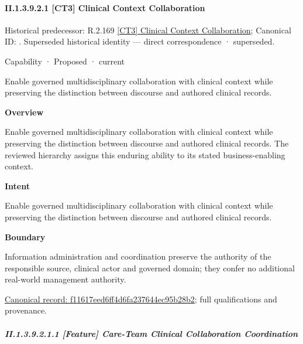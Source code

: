 \paragraph*{II.1.3.9.2.1 [CT3] Clinical Context Collaboration}
\label{navigation:II.1.3.9.2.1}

{\small Historical predecessor: R.2.169 \hyperref[element:750ef0d8e1504a8e9a1fde9bf13a6d0c]{[CT3] Clinical Context Collaboration}; Canonical ID: \texttt{}. Superseded historical identity — direct correspondence · superseded.}\par
\label{element:f11617eed6ff4d6fa237644ec95b28b2}
{\small Capability · Proposed · current}\par

Enable governed multidisciplinary collaboration with clinical context while preserving the distinction between discourse and authored clinical records.



\textbf{Overview}



Enable governed multidisciplinary collaboration with clinical context while preserving the distinction between discourse and authored clinical records. The reviewed hierarchy assigns this enduring ability to its stated business-enabling context.



\textbf{Intent}



Enable governed multidisciplinary collaboration with clinical context while preserving the distinction between discourse and authored clinical records.



\textbf{Boundary}



Information administration and coordination preserve the authority of the responsible source, clinical actor and governed domain; they confer no additional real-world management authority.


{\footnotesize \href{../../../../../../../continuum/strategy/capability/f11617eed6ff4d6fa237644ec95b28b2.md}{Canonical record: f11617eed6ff4d6fa237644ec95b28b2}; full qualifications and provenance.}\par
\subparagraph*{II.1.3.9.2.1.1 [Feature] Care-Team Clinical Collaboration Coordination}
\label{navigation:II.1.3.9.2.1.1}

